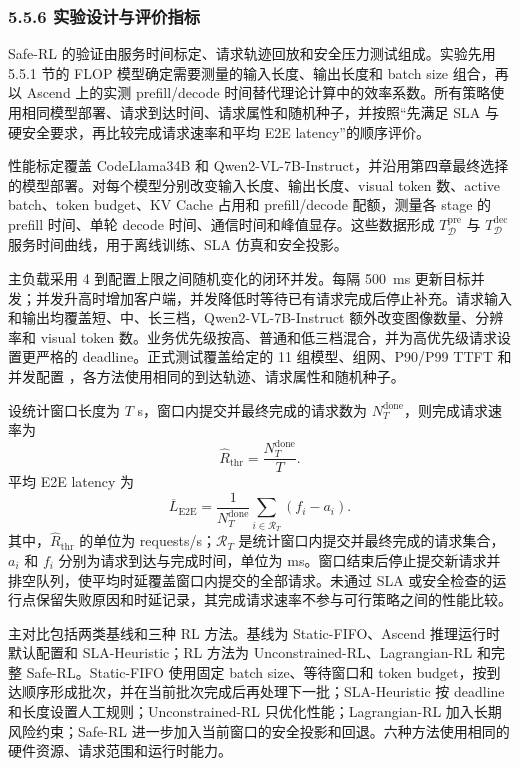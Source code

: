 \subsubsection*{5.5.6 实验设计与评价指标}

Safe-RL 的验证由服务时间标定、请求轨迹回放和安全压力测试组成。实验先用 5.5.1 节的 FLOP 模型确定需要测量的输入长度、输出长度和 batch size 组合，再以 Ascend 上的实测 prefill/decode 时间替代理论计算中的效率系数。所有策略使用相同模型部署、请求到达时间、请求属性和随机种子，并按照“先满足 SLA 与硬安全要求，再比较完成请求速率和平均 E2E latency”的顺序评价。

性能标定覆盖 CodeLlama34B 和 Qwen2-VL-7B-Instruct，并沿用第四章最终选择的模型部署。对每个模型分别改变输入长度、输出长度、visual token 数、active batch、token budget、KV Cache 占用和 prefill/decode 配额，测量各 stage 的 prefill 时间、单轮 decode 时间、通信时间和峰值显存。这些数据形成 \(T^{\mathrm{pre}}_{\mathcal D}\) 与 \(T^{\mathrm{dec}}_{\mathcal D}\) 服务时间曲线，用于离线训练、SLA 仿真和安全投影。

主负载采用 4 到配置上限之间随机变化的闭环并发。每隔 500~ms 更新目标并发；并发升高时增加客户端，并发降低时等待已有请求完成后停止补充。请求输入和输出均覆盖短、中、长三档，Qwen2-VL-7B-Instruct 额外改变图像数量、分辨率和 visual token 数。业务优先级按高、普通和低三档混合，并为高优先级请求设置更严格的 deadline。正式测试覆盖给定的 11 组模型、组网、P90/P99 TTFT 和并发配置 \cite{huawei2026internal}，各方法使用相同的到达轨迹、请求属性和随机种子。

设统计窗口长度为 \(T\) s，窗口内提交并最终完成的请求数为 \(N_T^{\mathrm{done}}\)，则完成请求速率为
\[
\widehat R_{\mathrm{thr}}=
\frac{N_T^{\mathrm{done}}}{T}.
\]
平均 E2E latency 为
\[
\overline L_{\mathrm{E2E}}=
\frac{1}{N_T^{\mathrm{done}}}
\sum_{i\in\mathcal R_T}(f_i-a_i).
\]
其中，\(\widehat R_{\mathrm{thr}}\) 的单位为 requests/s；\(\mathcal R_T\) 是统计窗口内提交并最终完成的请求集合，\(a_i\) 和 \(f_i\) 分别为请求到达与完成时间，单位为 ms。窗口结束后停止提交新请求并排空队列，使平均时延覆盖窗口内提交的全部请求。未通过 SLA 或安全检查的运行点保留失败原因和时延记录，其完成请求速率不参与可行策略之间的性能比较。

主对比包括两类基线和三种 RL 方法。基线为 Static-FIFO、Ascend 推理运行时默认配置和 SLA-Heuristic；RL 方法为 Unconstrained-RL、Lagrangian-RL 和完整 Safe-RL。Static-FIFO 使用固定 batch size、等待窗口和 token budget，按到达顺序形成批次，并在当前批次完成后再处理下一批；SLA-Heuristic 按 deadline 和长度设置人工规则；Unconstrained-RL 只优化性能；Lagrangian-RL 加入长期风险约束；Safe-RL 进一步加入当前窗口的安全投影和回退。六种方法使用相同的硬件资源、请求范围和运行时能力。

